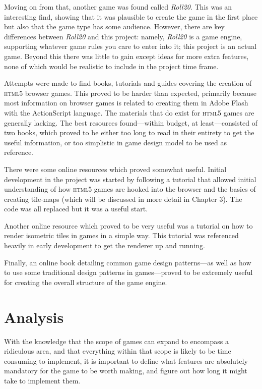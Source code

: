Moving on from that, another game was found called \textit{Roll20}\cite{citeulike:13141206}. This was an interesting find, showing that it was plausible to create the game in the first place but also that the game type has some audience. However, there are key differences between \textit{Roll20} and this project: namely, \textit{Roll20} is a game engine, supporting whatever game rules you care to enter into it; this project is an actual game. Beyond this there was little to gain except ideas for more extra features, none of which would be realistic to include in the project time frame.

Attempts were made to find books, tutorials and guides covering the creation of \textsc{html5} browser games. This proved to be harder than expected, primarily because most information on browser games is related to creating them in Adobe Flash with the ActionScript language. The materials that do exist for \textsc{html5} games are generally lacking. The best resources found---within budget, at least---consisted of two books\cite{citeulike:13000145, citeulike:13000170}, which proved to be either too long to read in their entirety to get the useful information, or too simplistic in game design model to be used as reference.

There were some online resources which proved somewhat useful. Initial development in the project was started by following a tutorial\cite{citeulike:13139212} that allowed initial understanding of how \textsc{html5} games are hooked into the browser and the basics of creating tile-maps (which will be discussed in more detail in Chapter 3). The code was all replaced but it was a useful start.

Another online resource which proved to be very useful was a tutorial on how to render isometric tiles in games in a simple way\cite{citeulike:13139216}. This tutorial was referenced heavily in early development to get the renderer up and running.

Finally, an online book detailing common game design patterns\cite{citeulike:13049596}---as well as how to use some traditional design patterns in games---proved to be extremely useful for creating the overall structure of the game engine.


\section{Analysis}
With the knowledge that the scope of games can expand to encompass a ridiculous area, and that everything within that scope is likely to be time consuming to implement, it is important to define what features are absolutely mandatory for the game to be worth making, and figure out how long it might take to implement them.

